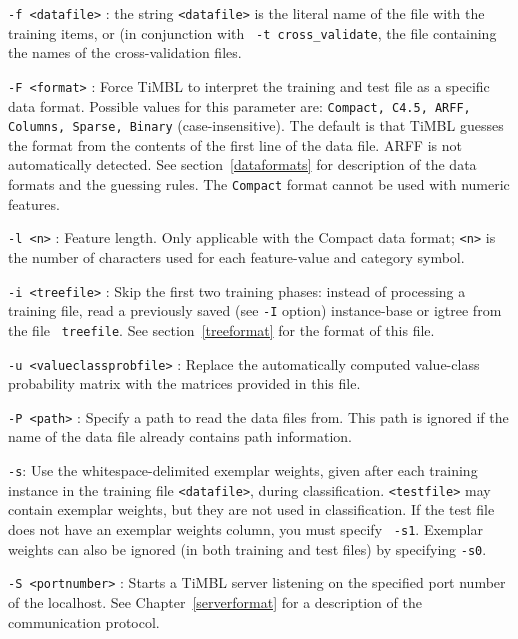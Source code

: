 \documentclass{report}
\begin{document}
\begin{description}

\item {\tt -f <datafile>} : the string {\tt <datafile>} is the literal
name of the file with the training items, or (in conjunction with {\tt
-t cross\_validate}, the file containing the names of the
cross-validation files.

\item {\tt -F <format>} : Force TiMBL to interpret the training and
test file as a specific data format. Possible values for this
parameter are: {\tt Compact, C4.5, ARFF, Columns, Sparse, Binary}
(case-insensitive). The default is that TiMBL guesses the format from
the contents of the first line of the data file. ARFF is not
automatically detected. See section~\ref{dataformats} for description
of the data formats and the guessing rules. The {\tt Compact} format
cannot be used with numeric features.

\item {\tt -l <n>} : Feature length. Only applicable with the Compact
  data format; {\tt <n>} is the number of characters used for each
  feature-value and category symbol.

\item {\tt -i <treefile>} : Skip the first two training phases:
  instead of processing a training file, read a previously saved (see
  {\tt -I} option) instance-base or {\sc igtree} from the file {\tt
    treefile}. See section~\ref{treeformat} for the format of this
  file.

\item {\tt -u <valueclassprobfile>} : Replace the automatically
  computed value-class probability matrix with the matrices provided
  in this file.

\item {\tt -P <path>} : Specify a path to read the data files
  from. This path is ignored if the name of the data file already
  contains path information.

\item {\tt -s}: Use the whitespace-delimited exemplar weights, given
  after each training instance in the training file {\tt <datafile>},
  during classification. {\tt <testfile>} may contain exemplar
  weights, but they are not used in classification. If the test file
  does not have an exemplar weights column, you must specify {\tt
    -s1}. Exemplar weights can also be ignored (in both training and
  test files) by specifying {\tt -s0}.

\item {\tt -S <portnumber>} : Starts a TiMBL server listening on the
  specified port number of the localhost. See
  Chapter~\ref{serverformat} for a description of the communication
  protocol.

\end{description}
\end{document}
